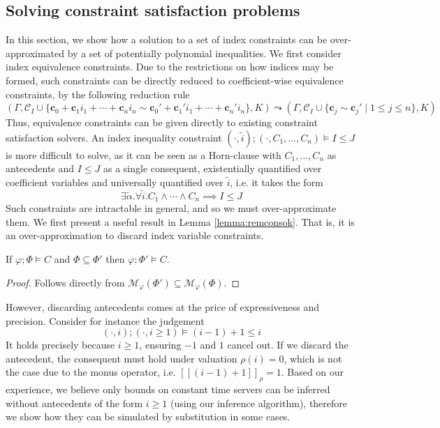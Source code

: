 \subsection{Solving constraint satisfaction problems}\label{sec:solvcons}

In this section, we show how a solution to a set of index constraints can be over-approximated by a set of potentially polynomial inequalities. We first consider index equivalence constraints. Due to the restrictions on how indices may be formed, such constraints can be directly reduced to coefficient-wise equivalence constraints, by the following reduction rule
\begin{equation*}
    (\Gamma,\mathcal{C}_I \cup \{\mathbf{c}_0 + \mathbf{c}_1 i_1 + \cdots + \mathbf{c}_n i_n \sim \mathbf{c}_0' + \mathbf{c}_1' i_1 + \cdots + \mathbf{c}_n' i_n\},K) \leadsto (\Gamma,\mathcal{C}_I \cup \{ \mathbf{c}_j \sim \mathbf{c}_j' \mid 1 \leq j \leq n \},K)
\end{equation*}
Thus, equivalence constraints can be given directly to existing constraint satisfaction solvers. An index inequality constraint $(\cdot,\widetilde{i});(\cdot,C_1,\dots,C_n)\vDash I \leq J$ is more difficult to solve, as it can be seen as a Horn-clause with $C_1,\dots,C_n$ as antecedents and $I\leq J$ as a single consequent, existentially quantified over coefficient variables and universally quantified over $\widetilde{i}$, i.e. it takes the form
\begin{equation*}
    \exists\widetilde{\alpha}.\forall\widetilde{i}.C_1\land\cdots\land C_n \implies I \leq J
\end{equation*}
Such constraints are intractable in general, and so we must over-approximate them. We first present a useful result in Lemma \ref{lemma:remconsok}. That is, it is an over-approximation to discard index variable constraints.
%
\begin{lemma}\label{lemma:remconsok}
If $\varphi;\Phi\vDash C$ and $\Phi\subseteq\Phi'$ then $\varphi;\Phi'\vDash C$.
\begin{proof}
Follows directly from $\mathcal{M}_\varphi(\Phi') \subseteq \mathcal{M}_\varphi(\Phi)$.
\end{proof}
\end{lemma}
%
However, discarding antecedents comes at the price of expressiveness and precision. Consider for instance the judgement
\begin{equation*}
    (\cdot,i);(\cdot,i\geq 1)\vDash (i-1) + 1 \leq i
\end{equation*}
It holds precisely because $i\geq 1$, ensuring $-1$ and $1$ cancel out. If we discard the antecedent, the consequent must hold under valuation $\rho(i)=0$, which is not the case due to the monus operator, i.e. $[\![(i-1)+1]\!]_\rho = 1$. Based on our experience, we believe only bounds on constant time servers can be inferred without antecedents of the form $i\geq 1$ (using our inference algorithm), therefore we show how they can be simulated by substitution in some cases.\\

